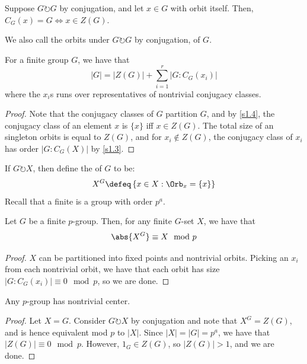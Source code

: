 \documentclass[12pt]{scrartcl}
\begin{document}
\begin{corollary}
	\label{s1.4}
Suppose $G \circlearrowright G$ by conjugation, and let $x \in G$ with orbit itself.
Then, $C_G(x) = G \Leftrightarrow x \in Z(G)$.
\end{corollary}
We also call the orbits under $G \circlearrowright G$ by conjugation,  of $G$. 
\begin{theorem}
	\label{s1.5}
	For a finite group $G$, we have that
	\[
|G| = |Z(G)| + \sum_{i=1}^r |G : C_G(x_i)|	
	\] 
	where the $x_i$s runs over representatives of nontrivial conjugacy classes.
\end{theorem}
\begin{proof}
	Note that the conjugacy classes of $G$ partition $G$, and by \ref{s1.4}, the conjugacy class of an element $x$ is $\{x\}$ iff $x \in Z(G)$.
The total size of an singleton orbits is equal to $Z(G)$, and for $x_i \not \in Z(G)$, the conjugacy class of $x_i$ has order $|G : C_G(X)|$ by \ref{s1.3}.
\end{proof}
If $G \circlearrowright X$, then define the  of $G$ to be:
\[
X^G \defeq \left\{x \in X: \Orb_x = \left\{x\right\}\right\}
\] 
Recall that a finite  is a group with order $p^a$.
\begin{proposition}
	\label{s1.6}
Let $G$ be a finite $p$-group.
Then, for any finite $G$-set $X$, we have that
\[
	\abs{X^G} \equiv X \mod p
\]  
\end{proposition}
\begin{proof}
$X$ can be partitioned into fixed points and nontrivial orbits.
Picking an $x_i$ from each nontrivial orbit, we have that each orbit has size $|G : C_G(x_i)| \equiv 0 \mod p$, so we are done. 
\end{proof}

\begin{corollary}
	\label{s1.7}
Any $p$-group has nontrivial center.
\end{corollary}
\begin{proof}
	Let $X = G$.
Consider $G \circlearrowright X$ by conjugation and note that $X^G = Z(G)$, and is hence equivalent mod $p$ to $|X|$.
Since $|X| = |G| = p^a$, we have that $|Z(G)| \equiv 0 \mod p$.  
However, $1_G \in Z(G)$, so $|Z(G)| > 1$, and we are done. 
\end{proof}
\end{document}
